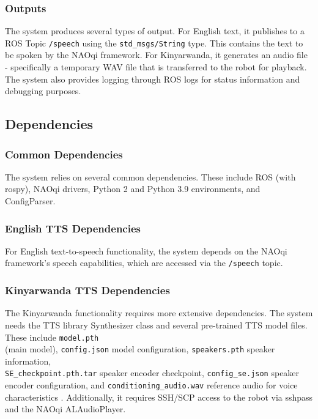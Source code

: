 \documentclass{CSSRforAfrica}
\begin{document}
\subsubsection{Outputs}

The system produces several types of output. For English text, it publishes to a ROS Topic \texttt{/speech} using the \texttt{std\_msgs/String} type. This contains the text to be spoken by the NAOqi framework. For Kinyarwanda, it generates an audio file - specifically a temporary WAV file that is transferred to the robot for playback. The system also provides logging through ROS logs for status information and debugging purposes.

\subsection{Dependencies}

\subsubsection{Common Dependencies}

The system relies on several common dependencies. These include ROS (with rospy), NAOqi drivers, Python 2 and Python 3.9 environments, and ConfigParser.

\subsubsection{English TTS Dependencies}

For English text-to-speech functionality, the system depends on the NAOqi framework's speech capabilities, which are accessed via the \texttt{/speech} topic.

\subsubsection{Kinyarwanda TTS Dependencies}

The Kinyarwanda functionality requires more extensive dependencies. The system needs the TTS library Synthesizer class and several pre-trained TTS model files. These include \texttt{model.pth} \\ (main model), \texttt{config.json} model configuration, \texttt{speakers.pth} speaker information, \\ \texttt{SE\_checkpoint.pth.tar} speaker encoder checkpoint, \texttt{config\_se.json} speaker encoder configuration, and \texttt{conditioning\_audio.wav} reference audio for voice characteristics \cite{kim2021conditional}. Additionally, it requires SSH/SCP access to the robot via sshpass and the NAOqi ALAudioPlayer.
\end{document}
